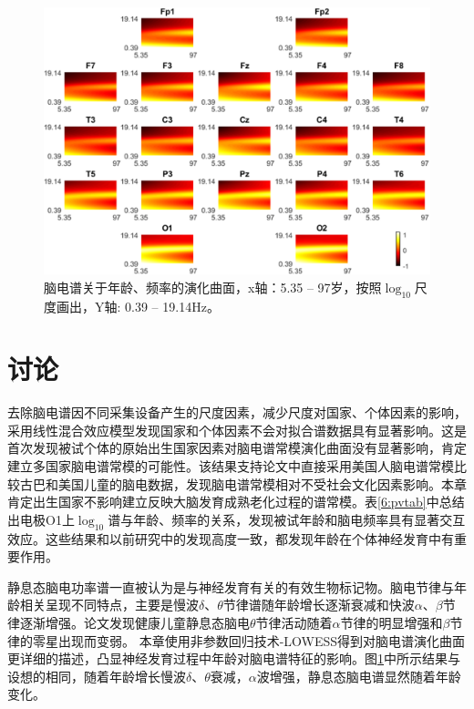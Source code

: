 \bigskip
\bigskip
\bigskip
\begin{figure}[!ht]
\includegraphics[width=15cm]{pic/Norm/figure6.png}
\caption{脑电谱关于年龄、频率的演化曲面，x轴：5.35 – 97岁，按照$\log_{10}$尺度画出，Y轴: 0.39 – 19.14Hz。}
\label{6:surf}
\end{figure}

\section{讨论}
去除脑电谱因不同采集设备产生的尺度因素，减少尺度对国家、个体因素的影响，采用线性混合效应模型发现国家和个体因素不会对拟合谱数据具有显著影响。这是首次发现被试个体的原始出生国家因素对脑电谱常模演化曲面没有显著影响，肯定建立多国家脑电谱常模的可能性。该结果支持论文中直接采用美国人脑电谱常模比较古巴和美国儿童的脑电数据，发现脑电谱常模相对不受社会文化因素影响。本章
肯定出生国家不影响建立反映大脑发育成熟老化过程的谱常模。表\ref{6:pvtab}中总结出电极O1上$\log_{10}$谱与年龄、频率的关系，发现被试年龄和脑电频率具有显著交互效应。这些结果和以前研究中的发现高度一致，都发现年龄在个体神经发育中有重要作用。

静息态脑电功率谱一直被认为是与神经发育有关的有效生物标记物。脑电节律与年龄相关呈现不同特点，主要是慢波$\delta$、$\theta$节律谱随年龄增长逐渐衰减和快波$\alpha$、$\beta$节律逐渐增强。论文发现健康儿童静息态脑电$\theta$节律活动随着$\alpha$节律的明显增强和$\beta$节律的零星出现而变弱。 本章使用非参数回归技术-LOWESS得到对脑电谱演化曲面更详细的描述，凸显神经发育过程中年龄对脑电谱特征的影响。图\ref{6:surf}中所示结果与设想的相同，随着年龄增长慢波$\delta$、$\theta$衰减，$\alpha$波增强，静息态脑电谱显然随着年龄变化。


